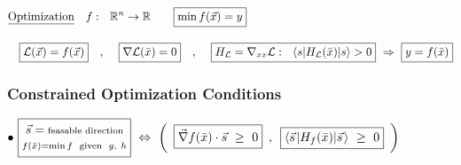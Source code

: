\documentclass[12pt]{article}
\begin{document}
\vspace{10pt}
\(
    \begin{aligned}[t]
        &\text{\underline{Optimization}} 
            \hspace{10pt} 
            f: \ \ \mathbb{R}^n \rightarrow \mathbb{R}
            \hspace{20pt}
            \boxed{ \min f(\vec{x}) = y} 
            \\[10pt]
        &\hspace{10pt} 
            \boxed{ \mathcal{L}(\vec{x}) = f(\vec{x}) }
            \hspace{10pt} , \hspace{12pt}
            \boxed{ \nabla \mathcal{L}(\bar{x}) = 0 }
            \hspace{10pt} , \hspace{12pt}
            \boxed{ 
                H_\mathcal{L} = \nabla_{xx} \mathcal{L}: \ \
                \langle s | H_\mathcal{L}(\bar{x}) | s \rangle > 0 
            }
            \ \Rightarrow \ \boxed{ y = f(\bar{x}) }
    \end{aligned}
\)

\vspace{15pt}
\subsubsection{Constrained Optimization Conditions}

\vspace{5pt}
\(
    \bullet\ 
    \boxed{
        \begin{gathered}
            \vec{s} = \text{\scriptsize feasable direction} \\[-3pt]
            {\scriptstyle f(\bar{x}) = \min f \text{ \ given \ } g,\ h}
        \end{gathered}
    }
    \ \Leftrightarrow \ 
    \left(\hspace{5pt}
        \boxed{ \vec{\nabla} f(\bar{x}) \cdot \vec{s} \ \geq\ 0 }
        \hspace{5pt} , \hspace{5pt} 
        \boxed{ \langle \vec{s} \hspace{1pt} | H_f(\bar{x}) | \vec{s} \hspace{1pt} \rangle \ \geq\ 0 }
    \hspace{5pt}\right)
\)
\end{document}
